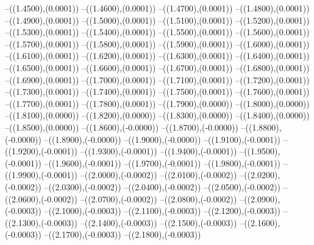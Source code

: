 {	--({\sx*(1.4500)},{\sy*(0.0001)})
	--({\sx*(1.4600)},{\sy*(0.0001)})
	--({\sx*(1.4700)},{\sy*(0.0001)})
	--({\sx*(1.4800)},{\sy*(0.0001)})
	--({\sx*(1.4900)},{\sy*(0.0001)})
	--({\sx*(1.5000)},{\sy*(0.0001)})
	--({\sx*(1.5100)},{\sy*(0.0001)})
	--({\sx*(1.5200)},{\sy*(0.0001)})
	--({\sx*(1.5300)},{\sy*(0.0001)})
	--({\sx*(1.5400)},{\sy*(0.0001)})
	--({\sx*(1.5500)},{\sy*(0.0001)})
	--({\sx*(1.5600)},{\sy*(0.0001)})
	--({\sx*(1.5700)},{\sy*(0.0001)})
	--({\sx*(1.5800)},{\sy*(0.0001)})
	--({\sx*(1.5900)},{\sy*(0.0001)})
	--({\sx*(1.6000)},{\sy*(0.0001)})
	--({\sx*(1.6100)},{\sy*(0.0001)})
	--({\sx*(1.6200)},{\sy*(0.0001)})
	--({\sx*(1.6300)},{\sy*(0.0001)})
	--({\sx*(1.6400)},{\sy*(0.0001)})
	--({\sx*(1.6500)},{\sy*(0.0001)})
	--({\sx*(1.6600)},{\sy*(0.0001)})
	--({\sx*(1.6700)},{\sy*(0.0001)})
	--({\sx*(1.6800)},{\sy*(0.0001)})
	--({\sx*(1.6900)},{\sy*(0.0001)})
	--({\sx*(1.7000)},{\sy*(0.0001)})
	--({\sx*(1.7100)},{\sy*(0.0001)})
	--({\sx*(1.7200)},{\sy*(0.0001)})
	--({\sx*(1.7300)},{\sy*(0.0001)})
	--({\sx*(1.7400)},{\sy*(0.0001)})
	--({\sx*(1.7500)},{\sy*(0.0001)})
	--({\sx*(1.7600)},{\sy*(0.0001)})
	--({\sx*(1.7700)},{\sy*(0.0001)})
	--({\sx*(1.7800)},{\sy*(0.0001)})
	--({\sx*(1.7900)},{\sy*(0.0000)})
	--({\sx*(1.8000)},{\sy*(0.0000)})
	--({\sx*(1.8100)},{\sy*(0.0000)})
	--({\sx*(1.8200)},{\sy*(0.0000)})
	--({\sx*(1.8300)},{\sy*(0.0000)})
	--({\sx*(1.8400)},{\sy*(0.0000)})
	--({\sx*(1.8500)},{\sy*(0.0000)})
	--({\sx*(1.8600)},{\sy*(-0.0000)})
	--({\sx*(1.8700)},{\sy*(-0.0000)})
	--({\sx*(1.8800)},{\sy*(-0.0000)})
	--({\sx*(1.8900)},{\sy*(-0.0000)})
	--({\sx*(1.9000)},{\sy*(-0.0000)})
	--({\sx*(1.9100)},{\sy*(-0.0001)})
	--({\sx*(1.9200)},{\sy*(-0.0001)})
	--({\sx*(1.9300)},{\sy*(-0.0001)})
	--({\sx*(1.9400)},{\sy*(-0.0001)})
	--({\sx*(1.9500)},{\sy*(-0.0001)})
	--({\sx*(1.9600)},{\sy*(-0.0001)})
	--({\sx*(1.9700)},{\sy*(-0.0001)})
	--({\sx*(1.9800)},{\sy*(-0.0001)})
	--({\sx*(1.9900)},{\sy*(-0.0001)})
	--({\sx*(2.0000)},{\sy*(-0.0002)})
	--({\sx*(2.0100)},{\sy*(-0.0002)})
	--({\sx*(2.0200)},{\sy*(-0.0002)})
	--({\sx*(2.0300)},{\sy*(-0.0002)})
	--({\sx*(2.0400)},{\sy*(-0.0002)})
	--({\sx*(2.0500)},{\sy*(-0.0002)})
	--({\sx*(2.0600)},{\sy*(-0.0002)})
	--({\sx*(2.0700)},{\sy*(-0.0002)})
	--({\sx*(2.0800)},{\sy*(-0.0002)})
	--({\sx*(2.0900)},{\sy*(-0.0003)})
	--({\sx*(2.1000)},{\sy*(-0.0003)})
	--({\sx*(2.1100)},{\sy*(-0.0003)})
	--({\sx*(2.1200)},{\sy*(-0.0003)})
	--({\sx*(2.1300)},{\sy*(-0.0003)})
	--({\sx*(2.1400)},{\sy*(-0.0003)})
	--({\sx*(2.1500)},{\sy*(-0.0003)})
	--({\sx*(2.1600)},{\sy*(-0.0003)})
	--({\sx*(2.1700)},{\sy*(-0.0003)})
	--({\sx*(2.1800)},{\sy*(-0.0003)})
}
